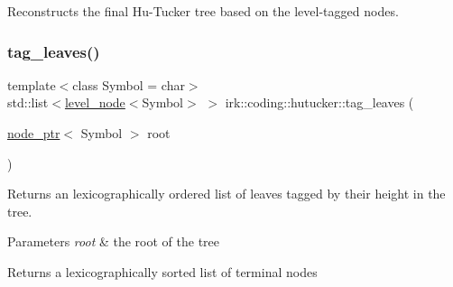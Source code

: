 Reconstructs the final Hu-\/\+Tucker tree based on the level-\/tagged nodes. 

\mbox{\label{namespaceirk_1_1coding_1_1hutucker_ab9d1b71846f97891dc2d3f262f5e73ec}} 
\subsubsection{\texorpdfstring{tag\+\_\+leaves()}{tag\_leaves()}}
{\footnotesize\ttfamily template$<$class Symbol  = char$>$ \\
std\+::list$<$\mbox{\hyperlink{structirk_1_1coding_1_1hutucker_1_1level__node}{level\+\_\+node}}$<$Symbol$>$ $>$ irk\+::coding\+::hutucker\+::tag\+\_\+leaves (\begin{DoxyParamCaption}\item[{\mbox{\hyperlink{namespaceirk_1_1coding_1_1hutucker_aa5d22cfdf05ffec38f2531e0307248fe}{node\+\_\+ptr}}$<$ Symbol $>$}]{root }\end{DoxyParamCaption})}

Returns an lexicographically ordered list of leaves tagged by their height in the tree. ~\newline



\begin{DoxyParams}{Parameters}
{\em root} & the root of the tree \\
\hline
\end{DoxyParams}
\begin{DoxyReturn}{Returns}
a lexicographically sorted list of terminal nodes 
\end{DoxyReturn}
